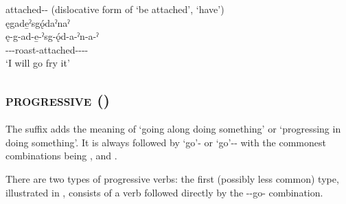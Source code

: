 \z


\ea\label{ex:disposex3}  attached-{\joinerA}-\exsc{\dislocative} (dislocative form of  ‘be attached’, ‘have’)\\
ęgade̱ˀsgǫ́daˀnaˀ\\
\gll ę-g-ad-e̱-ˀsg-ǫ́d-a-ˀn-a-ˀ\\
 \fut--{\joinerE}-roast-attached-{\joinerA}-{\dislocative}-{\joinerA}-{\punctual}\\
\glt `I will go fry it'

\z


\subsection{ \textsc{progressive} (\progressive)} \label{Progressive [-gy] suffix}
The  {\progressive} suffix adds the meaning of ‘going along doing something’ or ‘progressing in doing something’. It is always followed by  ‘go’-{\stative} or  ‘go’-{\purposive}-{\stative} with the commonest combinations being ,  and .

There are two types of progressive verbs: the first (possibly less common) type, illustrated in , consists of a verb followed directly by the  {\joinerA}-{\progressive}-go-{\stative} combination.

